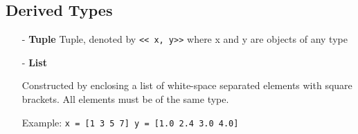 \documentclass[12pt]{report}
\begin{document}
\subsection{Derived Types}

\begin{itemize}
\item[-] \textbf{Tuple}
            Tuple, denoted by \texttt{<< x, y>>} where x and y are objects of any type
           
\item[-] \textbf{List}

			Constructed by enclosing a list of white-space separated elements with square brackets. All elements must be of the same type.

			Example: \texttt{x = [1 3 5 7] y = [1.0 2.4 3.0 4.0]}
			
\end{itemize}
			
\end{document}
